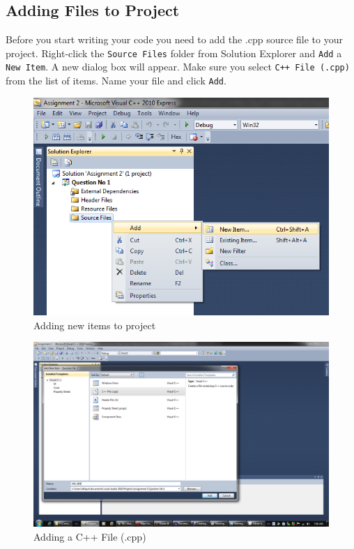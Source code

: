 \documentclass{article}
\begin{document}
\subsection{Adding Files to Project}
Before you start writing your code you need to add the .cpp source file to your project. Right-click the \verb|Source Files| folder from Solution Explorer and \verb|Add| a \verb|New Item|. A new dialog box will appear. Make sure you select \verb|C++ File (.cpp)| from the list of items. Name your file and click \verb|Add|.
\begin{figure}[H]
\centering
\includegraphics[scale=0.6]{Add_New_Item.png}
\caption{Adding new items to project}
\end{figure}
\begin{figure}[H]
\centering
\includegraphics[width=\textwidth]{Add_New_Item_Dialog.png}
\caption{Adding a C++ File (.cpp)}
\end{figure}
\end{document}
